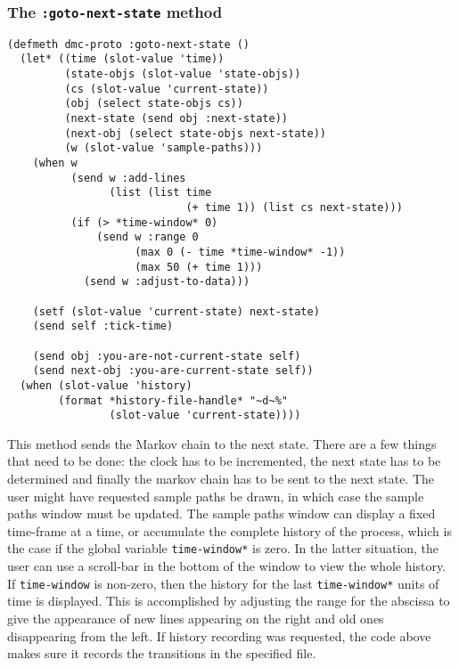 \subsubsection{The {\tt :goto-next-state} method}
\label{subsubsec:goto-next-state}
\begin{verbatim}
(defmeth dmc-proto :goto-next-state ()
  (let* ((time (slot-value 'time))
         (state-objs (slot-value 'state-objs))
         (cs (slot-value 'current-state))
         (obj (select state-objs cs))
         (next-state (send obj :next-state))
         (next-obj (select state-objs next-state))
         (w (slot-value 'sample-paths)))
    (when w 
          (send w :add-lines 
                (list (list time 
                            (+ time 1)) (list cs next-state)))
          (if (> *time-window* 0)
              (send w :range 0 
                    (max 0 (- time *time-window* -1)) 
                    (max 50 (+ time 1)))
            (send w :adjust-to-data)))
          
    (setf (slot-value 'current-state) next-state)
    (send self :tick-time)

    (send obj :you-are-not-current-state self)
    (send next-obj :you-are-current-state self))
  (when (slot-value 'history)
        (format *history-file-handle* "~d~%" 
                (slot-value 'current-state))))
\end{verbatim}
This method sends the Markov chain to the next state.  There are a few
things that need to be done: the clock has to be incremented, the
next state has to be determined and finally the markov chain has to be
sent to the next state.  The user might have requested sample paths be
drawn, in which case the sample paths window must be updated. The
sample paths window can display a fixed time-frame at a time, or
accumulate the complete history of the process, which is the case if
the global variable {\tt *time-window*} is zero.  In the latter
situation, the user can use a scroll-bar in the bottom of the window
to view the whole history.  If {\tt *time-window} is non-zero, then
the history for the last {\tt *time-window*} units of time is
displayed. This is accomplished by adjusting the range for the
abscissa to give the appearance of new lines appearing on the right
and old ones disappearing from the left. If  history recording was
requested, the code above makes sure it records the transitions in the
specified file. 

